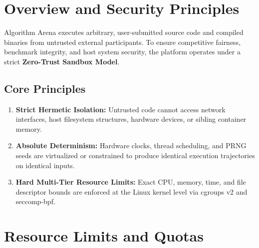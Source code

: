 \documentclass[11pt,a4paper]{article}
\begin{document}

\section{Overview and Security Principles}

Algorithm Arena executes arbitrary, user-submitted source code and compiled binaries from untrusted external participants. To ensure competitive fairness, benchmark integrity, and host system security, the platform operates under a strict \textbf{Zero-Trust Sandbox Model}.

\subsection{Core Principles}
\begin{enumerate}
    \item \textbf{Strict Hermetic Isolation:} Untrusted code cannot access network interfaces, host filesystem structures, hardware devices, or sibling container memory.
    \item \textbf{Absolute Determinism:} Hardware clocks, thread scheduling, and PRNG seeds are virtualized or constrained to produce identical execution trajectories on identical inputs.
    \item \textbf{Hard Multi-Tier Resource Limits:} Exact CPU, memory, time, and file descriptor bounds are enforced at the Linux kernel level via cgroups v2 and seccomp-bpf.
\end{enumerate}


\section{Resource Limits and Quotas}
\end{document}
